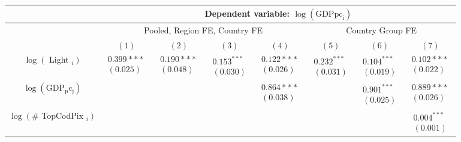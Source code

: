\documentclass[10pt]{article}
\begin{document}
\begin{center}
\begin{tabular}{|c|c|c|c|c|c|c|c|}
\hline
 & \multicolumn{7}{|c|}{Dependent variable: $\log \left(\mathrm{GDPpc}_{\mathrm{i}}\right)$} \\
\hline
 & \multicolumn{4}{|c|}{Pooled, Region FE, Country FE} & \multicolumn{3}{|c|}{Country Group FE} \\
\hline
 & $(1)$ & $(2)$ & $(3)$ & $(4)$ & $(5)$ & $(6)$ & $(7)$ \\
\hline
$\log \left(\right.$ Light $\left._{i}\right)$ & $\begin{array}{l}0.399 * * * \\ (0.025)\end{array}$ & $\begin{array}{l}0.190 * * * \\ (0.048)\end{array}$ & $\begin{array}{l}0.153^{* * *} \\ (0.030)\end{array}$ & $\begin{array}{l}0.122 * * * \\ (0.026)\end{array}$ & $\begin{array}{l}0.232^{* * *} \\ (0.031)\end{array}$ & $\begin{array}{l}0.104^{* * *} \\ (0.019)\end{array}$ & $\begin{array}{l}0.102 * * * \\ (0.022)\end{array}$ \\
\hline
$\log \left(\mathrm{GDP}_{\mathrm{p}} \mathrm{c}_{\mathrm{j}}\right)$ &  &  &  & $\begin{array}{l}0.864 * * * \\ (0.038)\end{array}$ &  & $\begin{array}{l}0.901^{* * *} \\ (0.025)\end{array}$ & $\begin{array}{l}0.889 * * * \\ (0.026)\end{array}$ \\
\hline
$\log \left(\#\right.$ TopCodPix $\left.{ }_{i}\right)$ &  &  &  &  &  &  & $\begin{array}{l}0.004^{* * *} \\ (0.001)\end{array}$ \\

\end{tabular}
\end{center}
\end{document}
